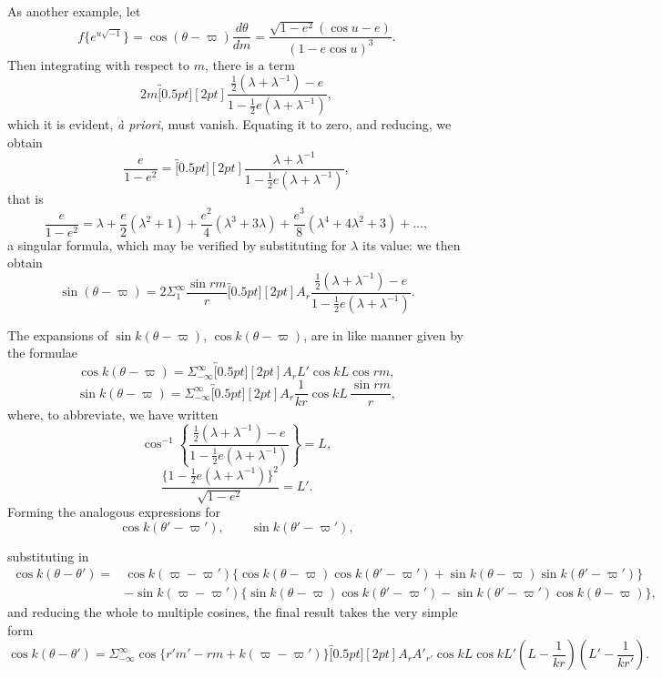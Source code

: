 \documentclass[11pt]{article}
\providecommand{\br}[1]{\overbracket[0.5pt][2pt]{#1}}
\providecommand{\half}{\tfrac12}
\begin{document}
As another example, let
\[
f\{e^{u\sqrt{-1}}\}=\cos(\theta-\varpi)\frac{d\theta}{dm}
=\frac{\sqrt{1-e^{2}}(\cos u-e)}{(1-e\cos u)^{3}}. \tag{29}
\]
Then integrating with respect to $m$, there is a term
\[
2m\br{\frac{\half(\lambda+\lambda^{-1})-e}{1-\half e(\lambda+\lambda^{-1})}} \tag{30},
\]
which it is evident, \textit{\`a priori}, must vanish. Equating it to zero, and reducing, we obtain
\[
\frac{e}{1-e^{2}}=
\br{\frac{\lambda+\lambda^{-1}}{1-\half e(\lambda+\lambda^{-1})}} \tag{31},
\]
that is
\[
\frac{e}{1-e^{2}}=
\lambda+\frac{e}{2}(\lambda^{2}+1)+\frac{e^{2}}{4}(\lambda^{3}+3\lambda)
+\frac{e^{3}}{8}(\lambda^{4}+4\lambda^{2}+3)+\ldots \tag{32},
\]
a singular formula, which may be verified by substituting for $\lambda$ its value: we then obtain
\[
\sin(\theta-\varpi)=
2\Sigma_{1}^{\infty}\frac{\sin rm}{r}
\br{A_r\frac{\half(\lambda+\lambda^{-1})-e}
{1-\half e(\lambda+\lambda^{-1})}}. \tag{33}
\]

The expansions of $\sin k(\theta-\varpi)$, $\cos k(\theta-\varpi)$, are in like manner
given by the formulae
\[
\cos k(\theta-\varpi)=
\Sigma_{-\infty}^{\infty}\br{A_rL' \cos kL}\cos rm, \tag{34}
\]
\[
\sin k(\theta-\varpi)=
\Sigma_{-\infty}^{\infty}\br{A_r\frac{1}{kr}\cos kL}\,\frac{\sin rm}{r}, \tag{35}
\]
where, to abbreviate, we have written
\[
\cos^{-1}\left\{
\frac{\half(\lambda+\lambda^{-1})-e}
{1-\half e(\lambda+\lambda^{-1})}
\right\}=L \tag{36},
\]
\[
\frac{\{1-\half e(\lambda+\lambda^{-1})\}^{2}}{\sqrt{1-e^{2}}}=L'. \tag{37}
\]
Forming the analogous expressions for
\[
\cos k(\theta'-\varpi'), \qquad \sin k(\theta'-\varpi'),
\]

\clearpage

substituting in
\[
\begin{aligned}
\cos k(\theta-\theta')={}&
\cos k(\varpi-\varpi')\{\cos k(\theta-\varpi)\cos k(\theta'-\varpi')
+\sin k(\theta-\varpi)\sin k(\theta'-\varpi')\}\\
&-\sin k(\varpi-\varpi')\{\sin k(\theta-\varpi)\cos k(\theta'-\varpi')
-\sin k(\theta'-\varpi')\cos k(\theta-\varpi)\},
\end{aligned}
\]
and reducing the whole to multiple cosines, the final result takes the very simple form
\[
\cos k(\theta-\theta')=
\Sigma_{-\infty}^{\infty}\cos\{r'm'-rm+k(\varpi-\varpi')\}
\br{A_rA'_{r'}\cos kL\cos kL'\left(L-\frac1{kr}\right)
\left(L'-\frac1{kr'}\right)}. \tag{38}
\]
\end{document}
